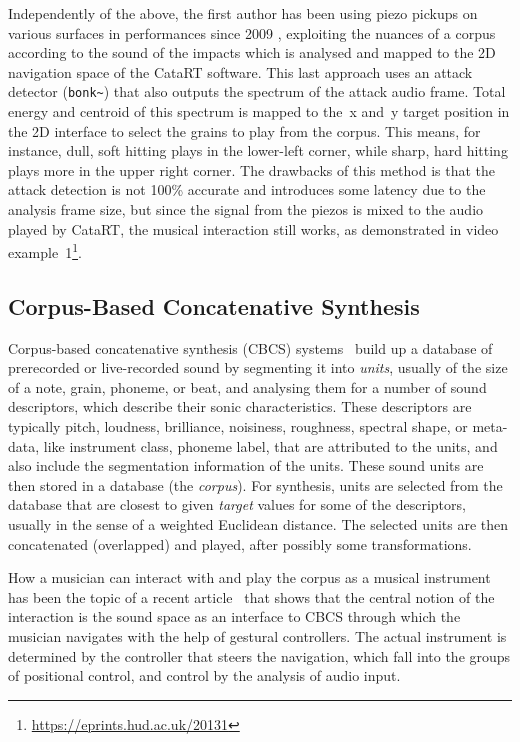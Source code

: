 Independently of the above, the first author has been using piezo pickups on various surfaces in performances since 2009 \cite{Schwarz-nime2012-sound-space}, exploiting the nuances of a corpus according to the sound of the impacts which is analysed and mapped to
the 2D navigation space of the CataRT software.
%
This last approach uses an attack detector (\verb|bonk~|) that also outputs the spectrum of the
attack audio frame.  Total energy and centroid of this spectrum is mapped to
the~x and~y target position in the 2D interface to select the grains to play from the corpus.
This means, for instance, dull, soft hitting plays in the lower-left corner, while sharp, hard hitting plays more in the upper right corner.
%
The drawbacks of this method is that the attack detection is not 100\% accurate and introduces some latency due to the analysis frame size, but since the signal from the piezos is mixed to the
audio played by CataRT, the musical interaction still works, as demonstrated in video example~1\footnote{\url{https://eprints.hud.ac.uk/20131}\label{videourl}}. %

\subsection{Corpus-Based Concatenative Synthesis}

Corpus-based concatenative synthesis (CBCS) systems~\cite{Schwarz-ieeespm2007-concat} build up a database of prerecorded or live-recorded sound by segmenting it into
\textit{units}, usually of the size of a note, grain, phoneme, or beat, and analysing them for a
number of sound descriptors, which describe their sonic characteristics.
These descriptors are typically pitch, loudness, brilliance, noisiness, roughness, spectral shape, or meta-data, like instrument class, phoneme label, that are attributed to the units,
and also include the segmentation information of the units.
These sound units are then stored in a database (the \textit{corpus}).  For synthesis, units are
selected from the database that are closest to given \textit{target} values for some of the
descriptors, usually in the sense of a weighted Euclidean distance.
The selected units are then concatenated (overlapped) and played, after possibly some transformations.

How a musician can interact with and play the corpus as a musical instrument has been the topic of a recent article~\cite{Schwarz-nime2012-sound-space} that shows that the central notion of the interaction is the sound space as an interface to CBCS through which the musician navigates with the help of gestural controllers.  
The actual instrument is determined by the controller that steers the
navigation, which fall into the groups of positional control, and control by the analysis of audio
input.

